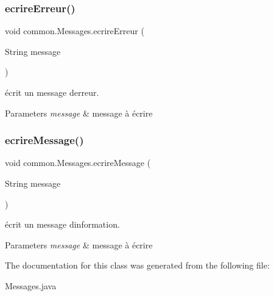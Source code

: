 \subsubsection{\texorpdfstring{ecrire\+Erreur()}{ecrireErreur()}}
{\footnotesize\ttfamily void common.\+Messages.\+ecrire\+Erreur (\begin{DoxyParamCaption}\item[{String}]{message }\end{DoxyParamCaption})\hspace{0.3cm}{\ttfamily [inline]}}



écrit un message d\textquotesingle{}erreur. 


\begin{DoxyParams}{Parameters}
{\em message} & message à écrire \\
\hline
\end{DoxyParams}
\mbox{\label{classcommon_1_1Messages_a6069bc66b0eda8fdd5966a7c7a8a1a0a}} 
\subsubsection{\texorpdfstring{ecrire\+Message()}{ecrireMessage()}}
{\footnotesize\ttfamily void common.\+Messages.\+ecrire\+Message (\begin{DoxyParamCaption}\item[{String}]{message }\end{DoxyParamCaption})\hspace{0.3cm}{\ttfamily [inline]}}



écrit un message d\textquotesingle{}information. 


\begin{DoxyParams}{Parameters}
{\em message} & message à écrire \\
\hline
\end{DoxyParams}


The documentation for this class was generated from the following file\+:\begin{DoxyCompactItemize}
\item 
Messages.\+java\end{DoxyCompactItemize}
